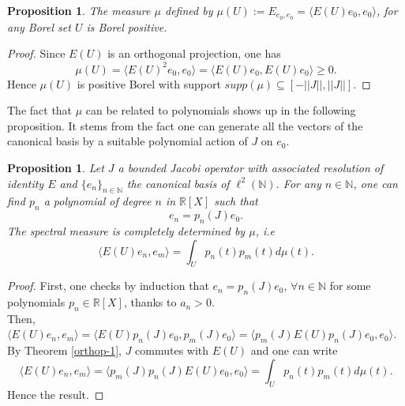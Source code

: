 \documentclass[a4paper,11pt,twoside]{article}
\numberwithin{equation}{section}
\newtheorem{proposition}[Theorem]{Proposition}
\theoremstyle{nonumberplain}
\newtheorem{proof}{Proof}
\begin{document}
\begin{proposition}\label{measure-proba}
The measure $\mu$ defined by $\mu(U):=E_{e_0,e_0}=\langle E(U)e_0,e_0 \rangle$, for any Borel set $U$ is Borel positive.
\end{proposition}
\begin{proof}
Since $E(U)$ is an orthogonal projection, one has 
\begin{equation}
\mu(U)=\langle E(U)^2e_0,e_0  \rangle=\langle E(U)e_0,E(U)e_0\rangle\ge0. 
\end{equation}
Hence $\mu(U)$ is positive Borel with support $supp(\mu)\subseteq[-||J||,||J||]$. 
\end{proof}
The fact that $\mu$ can be related to polynomials shows up in the following proposition. It stems from the fact one can generate all the vectors of the canonical basis by a suitable polynomial action of $J$ on $e_0$.
\begin{proposition}\label{matrixelem-spectral-meas}
Let $J$ a bounded Jacobi operator with associated resolution of identity $E$ and $\{e_n\}_{n\in\mathbb{N}}$ the canonical basis of $\ell^2(\mathbb{N})$. For any $n\in\mathbb{N}$, one can find $p_n$ a polynomial of degree $n$ in $\mathbb{R}[X]$ such that
\begin{equation}
e_n=p_n(J)e_0.
\end{equation}
The spectral measure is completely determined by $\mu$, i.e
\begin{equation}
\langle E(U)e_n,e_m \rangle=\int_{U}p_n(t)p_m(t)d\mu(t).
\end{equation}
\end{proposition}
\begin{proof}
First, one checks by induction that $e_n=p_n(J)e_0$, $\forall n\in\mathbb{N}$ for some polynomials $p_n\in\mathbb{R}[X]$, thanks to $a_n>0$. \\
Then, $\langle E(U)e_n,e_m \rangle=\langle E(U)p_n(J)e_0,p_m(J)e_0\rangle=\langle p_m(J)E(U)p_n(J)e_0,e_0\rangle$. By Theorem \ref{orthop-1}, $J$ commutes with $E(U)$ and one can write 
\begin{equation}
\langle E(U)e_n,e_m \rangle=\langle p_m(J)p_n(J)E(U)e_0,e_0\rangle=\int_{U}p_n(t)p_m(t)d\mu(t).
\end{equation}
Hence the result.
\end{proof}
\end{document}
